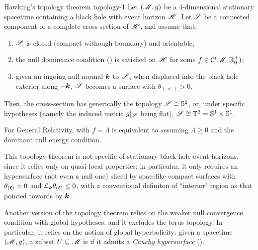 \begin{theorem}{Hawking's topology theorem \cite{hawking-1}}{topology-1}
  Let $ (\mathscr{M} , g) $ be a $ 4 $-dimensional stationary spacetime containing a black hole with event horizon $ \mathscr{H} $. Let $ \mathscr{S} $ be a connected component of a complete cross-section of $ \mathscr{H} $, and assume that:
  \begin{enumerate}
    \item \label{item:htt-1} $ \mathscr{S} $ is closed (compact withough boundary) and orientable;
    \item \label{item:htt-2} the null dominance condition () is satisfied on $ \mathscr{H} $ for some $ f \in \mathcal{C}^{(}\mathscr{M} , \mathbb{R}^+_0) $;
    \item \label{item:htt-3} given an ingoing null normal $ \boldsymbol{k} $ to $ \mathscr{S} $, when displaced into the black hole exterior along $ - \boldsymbol{k} $, $ \mathscr{S} $ becomes a surface with $ \theta_{(\ll)} > 0 $.
  \end{enumerate}
  Then, the cross-section has generically the topology $ \mathscr{S} \cong \mathbb{S}^{2} $, or, under specific hypotheses (namely the induced metric $ g \vert_\mathscr{S} $ being flat), $ \mathscr{S} \cong \mathbb{T}^{2} = \mathbb{S}^{1} \times \mathbb{S}^{1} $.
\end{theorem}

For General Relativity,  with $ f = \Lambda $ is equivalent to assuming $ \Lambda \geq 0 $ and the dominant null energy condition.

This topology theorem is not specific of stationary black hole event horizons, since it relies only on quasi-local properties: in particular, it only requires an hypersurface (not even a null one) sliced by spacelike compact surfaces with $ \theta_{(\boldsymbol{\ell})} = 0 $ and $ \EuScript{L}_{\boldsymbol{k}} \theta_{(\boldsymbol{\ell})} \leq 0 $, with a conventional definiton of ``interior" region as that pointed towards by $ \boldsymbol{k} $.

Another version of the topology theorem relies on the weaker null convergence condition with global hypotheses, and it excludes the torus topology. In particular, it relies on the notion of global hyperbolicity: given a spacetime $ (\mathscr{M} , g) $, a subset $ U \subseteq \mathscr{M} $ is  if it admits a \emph{Cauchy hypersurface} ().

